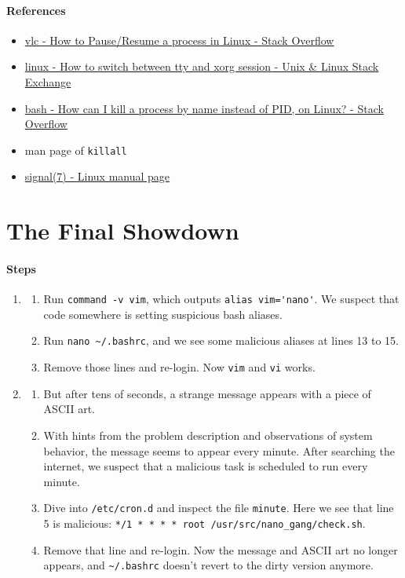 \documentclass[12pt, a4paper]{article}
\begin{document}
  \paragraph{References}
  \begin{itemize}
    \item \href{https://stackoverflow.com/questions/27844970/how-to-pause-resume-a-process-in-linux}{vlc - How to Pause/Resume a process in Linux - Stack Overflow}
    \item \href{ https://unix.stackexchange.com/questions/167386/how-to-switch-between-tty-and-xorg-session}{linux - How to switch between tty and xorg session - Unix \& Linux Stack Exchange}
    \item \href{https://stackoverflow.com/questions/160924/how-can-i-kill-a-process-by-name-instead-of-pid-on-linux}{bash - How can I kill a process by name instead of PID, on Linux? - Stack Overflow}
    \item man page of \verb|killall|
    \item \href{https://man7.org/linux/man-pages/man7/signal.7.html}{signal(7) - Linux manual page}
  \end{itemize}

  \section{The Final Showdown}
  \paragraph{Steps}
  \begin{enumerate}
    \item
    \begin{enumerate}
      \item Run \verb|command -v vim|, which outputs \verb|alias vim='nano'|.
        We suspect that code somewhere is setting suspicious bash aliases.
      \item Run \verb|nano ~/.bashrc|, and we see some malicious aliases at
        lines 13 to 15.
      \item Remove those lines and re-login. Now \verb|vim| and \verb|vi| works.
    \end{enumerate}
    \item
    \begin{enumerate}
      \item But after tens of seconds, a strange message appears with a piece of
        ASCII art.
      \item With hints from the problem description and observations of system
        behavior, the message seems to appear every minute. After searching
        the internet, we suspect that a malicious task is scheduled to run
        every minute.
      \item Dive into \verb|/etc/cron.d| and inspect the file \verb|minute|.
        Here we see that line 5 is malicious:
        \verb|*/1 * * * * root /usr/src/nano_gang/check.sh|.
      \item Remove that line and re-login. Now the message and ASCII art no
        longer appears, and \verb|~/.bashrc| doesn't revert to the dirty
        version anymore.
    \end{enumerate}
  \end{enumerate}
\end{document}
